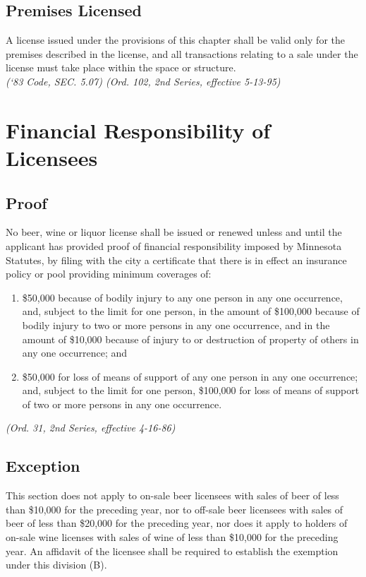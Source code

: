 \subsection{Premises Licensed}
A license issued under the provisions of this chapter shall be valid only for the premises described in the license, and all transactions relating to a sale under the license must take place within the space or structure.\\
\emph{(‘83 Code, SEC. 5.07)  (Ord. 102, 2nd Series, effective 5-13-95)}
\section{Financial Responsibility of Licensees}
\subsection{Proof}
No beer, wine or liquor license shall be issued or renewed unless and until the applicant has provided proof of financial responsibility imposed by Minnesota Statutes, by filing with the city a certificate that there is in effect an insurance policy or pool providing minimum coverages of:
\begin{enumerate}[{\indent}1)]
    \item \$50,000 because of bodily injury to any one person in any one occurrence, and, subject to the limit for one person, in the amount of \$100,000 because of bodily injury to two or more persons in any one occurrence, and in the amount of \$10,000 because of injury to or destruction of property of others in any one occurrence; and 
    \item \$50,000 for loss of means of support of any one person in any one occurrence; and, subject to the limit for one person, \$100,000 for loss of means of support of two or more persons in any one occurrence.
\end{enumerate}
\emph{(Ord. 31, 2nd Series, effective 4-16-86)}
\subsection{Exception}
This section does not apply to on-sale beer licensees with sales of beer of less than \$10,000 for the preceding year, nor to off-sale beer licensees with sales of beer of less than \$20,000 for the preceding year, nor does it apply to holders of on-sale wine licenses with sales of wine of less than \$10,000 for the preceding year.  An affidavit of the licensee shall be required to establish the exemption under this division (B).
